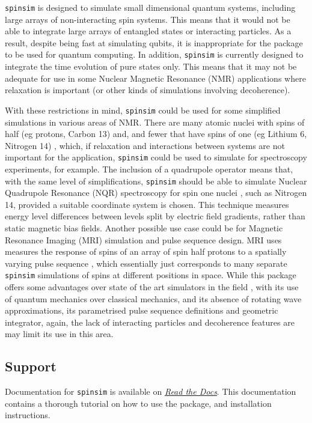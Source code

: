 \documentclass{jors}
\begin{document}
		\texttt{spinsim} is designed to simulate small dimensional quantum systems, including large arrays of non-interacting spin systems. This means that it would not be able to integrate large arrays of entangled states or interacting particles. As a result, despite being fast at simulating qubits, it is inappropriate for the package to be used for quantum computing. In addition, \texttt{spinsim} is currently designed to integrate the time evolution of pure states only. This means that it may not be adequate for use in some Nuclear Magnetic Resonance (NMR) applications where relaxation \cite{veshtort_spinevolution_2006} is important (or other kinds of simulations involving decoherence).

		With these restrictions in mind, \texttt{spinsim} could be used for some simplified simulations in various areas of NMR. There are many atomic nuclei with spins of half (eg protons, Carbon 13) and, and fewer that have spins of one (eg Lithium 6, Nitrogen 14) \cite{fuller_nuclear_1976}, which, if relaxation and interactions between systems are not important for the application, \texttt{spinsim} could be used to simulate for spectroscopy experiments, for example. The inclusion of a quadrupole operator means that, with the same level of simplifications, \texttt{spinsim} should be able to simulate Nuclear Quadrupole Resonance (NQR) spectroscopy for spin one nuclei \cite{bain_nqr_2004}, such as Nitrogen 14, provided a suitable coordinate system is chosen. This technique measures energy level differences between levels split by electric field gradients, rather than static magnetic bias fields. Another possible use case could be for Magnetic Resonance Imaging (MRI) simulation and pulse sequence design. MRI uses measures the response of spins of an array of spin half protons to a spatially varying pulse sequence \cite{mckinnon_physics_1998}, which essentially just corresponds to many separate \texttt{spinsim} simulations of spins at different positions in space. While this package offers some advantages over state of the art simulators in the field \cite{kose_fast_2019}, with its use of quantum mechanics over classical mechanics, and its absence of rotating wave approximations, its parametrised pulse sequence definitions and geometric integrator, again, the lack of interacting particles and decoherence features are may limit its use in this area.

	\subsection{Support}
		Documentation for \texttt{spinsim} is available on \href{https://spinsim.readthedocs.io/en/latest/}{\emph{Read the Docs}}. This documentation contains a thorough tutorial on how to use the package, and installation instructions.
		
\end{document}
